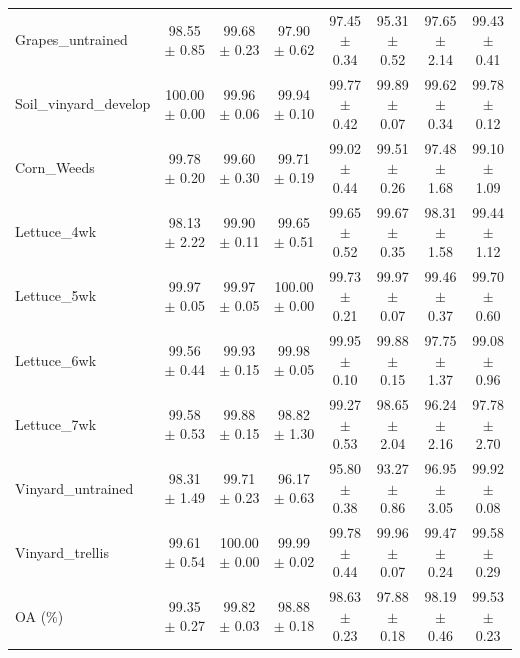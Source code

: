 \begin{table}[htbp]
{\begin{tabular}{l c c c c c c c}
    Grapes\_untrained & \textcolor{tgred}{98.55 $\pm$ 0.85} & \textcolor{tgteal}{99.68 $\pm$ 0.23} & 97.90 $\pm$ 0.62 & 97.45 $\pm$ 0.34 & 95.31 $\pm$ 0.52 & 97.65 $\pm$ 2.14 & \textcolor{tgblue}{99.43 $\pm$ 0.41} \\
    Soil\_vinyard\_develop & \textcolor{tgteal}{100.00 $\pm$ 0.00} & \textcolor{tgblue}{99.96 $\pm$ 0.06} & \textcolor{tgred}{99.94 $\pm$ 0.10} & 99.77 $\pm$ 0.42 & 99.89 $\pm$ 0.07 & 99.62 $\pm$ 0.34 & 99.78 $\pm$ 0.12 \\
    Corn\_Weeds & \textcolor{tgteal}{99.78 $\pm$ 0.20} & \textcolor{tgred}{99.60 $\pm$ 0.30} & \textcolor{tgblue}{99.71 $\pm$ 0.19} & 99.02 $\pm$ 0.44 & 99.51 $\pm$ 0.26 & 97.48 $\pm$ 1.68 & 99.10 $\pm$ 1.09 \\
    Lettuce\_4wk & 98.13 $\pm$ 2.22 & \textcolor{tgteal}{99.90 $\pm$ 0.11} & \textcolor{tgred}{99.65 $\pm$ 0.51} & \textcolor{tgred}{99.65 $\pm$ 0.52} & \textcolor{tgblue}{99.67 $\pm$ 0.35} & 98.31 $\pm$ 1.58 & 99.44 $\pm$ 1.12 \\
    Lettuce\_5wk & \textcolor{tgblue}{99.97 $\pm$ 0.05} & \textcolor{tgblue}{99.97 $\pm$ 0.05} & \textcolor{tgteal}{100.00 $\pm$ 0.00} & \textcolor{tgred}{99.73 $\pm$ 0.21} & \textcolor{tgblue}{99.97 $\pm$ 0.07} & 99.46 $\pm$ 0.37 & 99.70 $\pm$ 0.60 \\
    Lettuce\_6wk & 99.56 $\pm$ 0.44 & \textcolor{tgred}{99.93 $\pm$ 0.15} & \textcolor{tgteal}{99.98 $\pm$ 0.05} & \textcolor{tgblue}{99.95 $\pm$ 0.10} & 99.88 $\pm$ 0.15 & 97.75 $\pm$ 1.37 & 99.08 $\pm$ 0.96 \\
    Lettuce\_7wk & \textcolor{tgblue}{99.58 $\pm$ 0.53} & \textcolor{tgteal}{99.88 $\pm$ 0.15} & 98.82 $\pm$ 1.30 & \textcolor{tgred}{99.27 $\pm$ 0.53} & 98.65 $\pm$ 2.04 & 96.24 $\pm$ 2.16 & 97.78 $\pm$ 2.70 \\
    Vinyard\_untrained & \textcolor{tgred}{98.31 $\pm$ 1.49} & \textcolor{tgblue}{99.71 $\pm$ 0.23} & 96.17 $\pm$ 0.63 & 95.80 $\pm$ 0.38 & 93.27 $\pm$ 0.86 & 96.95 $\pm$ 3.05 & \textcolor{tgteal}{99.92 $\pm$ 0.08} \\
    Vinyard\_trellis & 99.61 $\pm$ 0.54 & \textcolor{tgteal}{100.00 $\pm$ 0.00} & \textcolor{tgblue}{99.99 $\pm$ 0.02} & 99.78 $\pm$ 0.44 & \textcolor{tgred}{99.96 $\pm$ 0.07} & 99.47 $\pm$ 0.24 & 99.58 $\pm$ 0.29 \\
    \midrule
    OA (\%) & \textcolor{tgred}{99.35 $\pm$ 0.27} & \textcolor{tgteal}{99.82 $\pm$ 0.03} & 98.88 $\pm$ 0.18 & 98.63 $\pm$ 0.23 & 97.88 $\pm$ 0.18 & 98.19 $\pm$ 0.46 & \textcolor{tgblue}{99.53 $\pm$ 0.23} \\

\end{tabular}}
\end{table}
